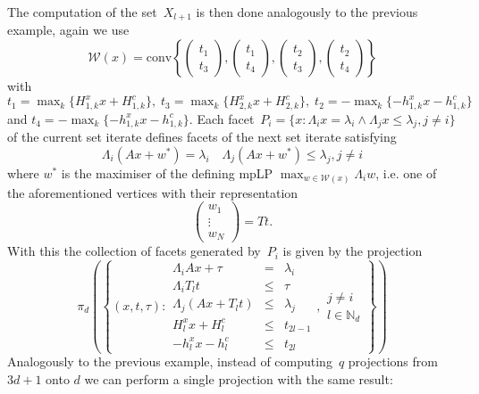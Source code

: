 \documentclass[smallextended]{svjour3}       %
\numberwithin{equation}{section}
\providecommand{\conv}{\text{conv}}
\begin{document}
The computation of the set~$X_{l+1}$ is then done analogously to the previous example, again we use 
%
$$
  \mathcal W(x) = \conv\left\{\begin{pmatrix}t_1\\ t_3\end{pmatrix},\begin{pmatrix}t_1\\ t_4\end{pmatrix},
  \begin{pmatrix} t_2\\ t_3\end{pmatrix},\begin{pmatrix}t_2\\ t_4\end{pmatrix}
  \right\}
$$
%
with $t_1=\max_k\{H_{1,k}^x x+H_{1,k}^c\},\; t_3=\max_k\{H_{2,k}^x x+H_{2,k}^c\},\; t_2=-\max_k\{-h_{1,k}^x x-h_{1,k}^c\}$ and $t_4=-\max_k\{-h_{1,k}^x x-h_{1,k}^c\}$.
%
Each facet~$P_i=\{x:\Lambda_i x=\lambda_i\wedge\Lambda_jx\leq\lambda_j,j\neq i\}$ of the current set iterate defines facets of the next set iterate satisfying
%
\begin{equation}
\Lambda_i(Ax+w^\ast)=\lambda_i\quad \Lambda_j(Ax+w^\ast)\leq\lambda_j,j\neq i
\end{equation}
%
where $w^\ast$ is the maximiser of the defining mpLP $\max_{w\in\mathcal W(x)}\Lambda_iw$, i.e. one of the aforementioned vertices with their representation
%
$$
  \begin{pmatrix} w_1\\ \vdots \\ w_N\end{pmatrix}= Tt.
$$
%
With this the collection of facets generated by~$P_i$ is given by the projection
%
\begin{equation}
  \pi_d\left(\left\{(x,t,\tau):\begin{array}{rcl}
  \Lambda_iAx+\tau&=&\lambda_i\\
  \Lambda_i T_lt&\leq&\tau\\
  \Lambda_j(Ax+T_lt)&\leq&\lambda_j\\
  H_l^x x + H_l^c&\leq&t_{2l-1}\\
  -h_l^x x - h_l^c&\leq&t_{2l}
  \end{array}, \begin{array}{l}
  j\neq i\\
  l\in\mathbb N_d\end{array}
  \right\}\right)
\end{equation}
%
Analogously to the previous example, instead of computing~$q$ projections from $3d+1$ onto $d$ we can perform a single projection with the same result:
\end{document}
